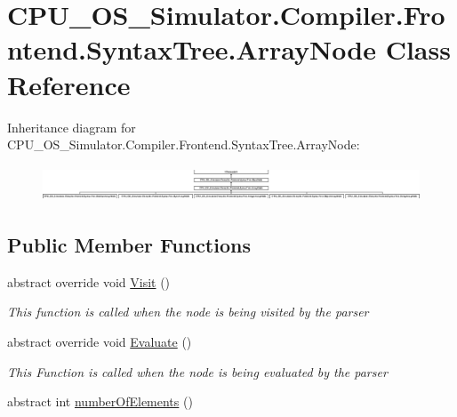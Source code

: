 \hypertarget{class_c_p_u___o_s___simulator_1_1_compiler_1_1_frontend_1_1_syntax_tree_1_1_array_node}{}\section{C\+P\+U\+\_\+\+O\+S\+\_\+\+Simulator.\+Compiler.\+Frontend.\+Syntax\+Tree.\+Array\+Node Class Reference}
\label{class_c_p_u___o_s___simulator_1_1_compiler_1_1_frontend_1_1_syntax_tree_1_1_array_node}
Inheritance diagram for C\+P\+U\+\_\+\+O\+S\+\_\+\+Simulator.\+Compiler.\+Frontend.\+Syntax\+Tree.\+Array\+Node\+:\begin{figure}[H]
\begin{center}
\leavevmode
\includegraphics[height=1.069212cm]{class_c_p_u___o_s___simulator_1_1_compiler_1_1_frontend_1_1_syntax_tree_1_1_array_node}
\end{center}
\end{figure}
\subsection*{Public Member Functions}
\begin{DoxyCompactItemize}
\item 
abstract override void \hyperlink{class_c_p_u___o_s___simulator_1_1_compiler_1_1_frontend_1_1_syntax_tree_1_1_array_node_aed695b6f32d5c176204fc15854db32db}{Visit} ()
\begin{DoxyCompactList}\small\item\em This function is called when the node is being visited by the parser \end{DoxyCompactList}\item 
abstract override void \hyperlink{class_c_p_u___o_s___simulator_1_1_compiler_1_1_frontend_1_1_syntax_tree_1_1_array_node_afdb5d2808dbd83c28c85f35b6430edc4}{Evaluate} ()
\begin{DoxyCompactList}\small\item\em This Function is called when the node is being evaluated by the parser \end{DoxyCompactList}\item 
abstract int \hyperlink{class_c_p_u___o_s___simulator_1_1_compiler_1_1_frontend_1_1_syntax_tree_1_1_array_node_a75232f3076d95a562405ef2722bcafd5}{number\+Of\+Elements} ()
\end{DoxyCompactItemize}
